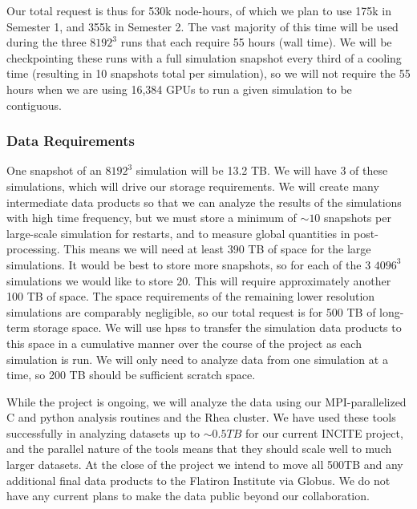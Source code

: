 \documentclass[11pt,letterpaper,english]{article}
\begin{document}
Our total request is thus for 530k node-hours, of which we plan to use 175k in Semester 1, and 355k in Semester 2. The vast majority of this time will be used during the three $8192^3$ runs that each require 55 hours (wall time). We will be checkpointing these runs with a full simulation snapshot every third of a cooling time (resulting in 10 snapshots total per simulation), so we will not require the 55 hours when we are using 16,384 GPUs to run a given simulation to be contiguous.

\vspace{-.2in}
\subsubsection{Data Requirements}
\vspace{-.25in}

One snapshot of an $8192^3$ simulation will be 13.2 TB. We will have 3 of these simulations, which will drive our storage requirements. We will create many intermediate data products so that we can analyze the results of the simulations with high time frequency, but we must store a minimum of ${\sim}10$ snapshots per large-scale simulation for restarts, and to measure global quantities in post-processing. This means we will need at least 390 TB of space for the large simulations. It would be best to store more snapshots, so for each of the 3 $4096^3$ simulations we would like to store 20. This will require approximately another 100 TB of space. The space requirements of the remaining lower resolution simulations are comparably negligible, so our total request is for 500 TB of long-term storage space. We will use hpss to transfer the simulation data products to this space in a cumulative manner over the course of the project as each simulation is run. We will only need to analyze data from one simulation at a time, so 200 TB should be sufficient scratch space.

While the project is ongoing, we will analyze the data using our MPI-parallelized C and python analysis routines and the Rhea cluster. We have used these tools successfully in analyzing datasets up to $\sim 0.5 TB$ for our current INCITE project, and the parallel nature of the tools means that they should scale well to much larger datasets. At the close of the project we intend to move all 500TB and any additional final data products to the Flatiron Institute via Globus. We do not have any current plans to make the data public beyond our collaboration.

\vspace{-.25in}
\end{document}
